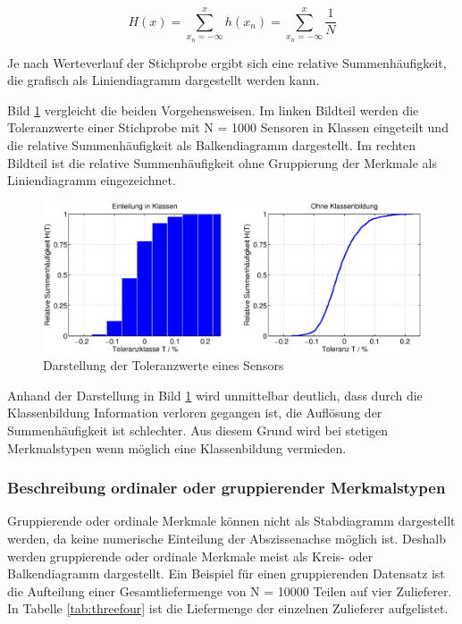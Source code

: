 \begin{equation}\label{eq:threefourteen}
H(x)=\sum _{x_{n} =-\infty }^{x}h(x_{n}) =\sum _{x_{n} =-\infty }^{x}\dfrac{1}{N}
\end{equation}

\noindent Je nach Werteverlauf der Stichprobe ergibt sich eine relative Summenh\"{a}ufigkeit, die grafisch als Liniendiagramm dargestellt werden kann. 

\noindent Bild \ref{fig:AuswertungDrucksensor} vergleicht die beiden Vorgehensweisen. Im linken Bildteil werden die Toleranzwerte einer Stichprobe mit N = 1000 Sensoren in Klassen eingeteilt und die relative Summenh\"{a}ufigkeit als Balkendiagramm dargestellt. Im rechten Bildteil ist die relative Summenh\"{a}ufigkeit ohne Gruppierung der Merkmale als Liniendiagramm eingezeichnet.

\noindent 
\begin{figure}[H]
  \centerline{\includegraphics[width=1\textwidth]{Kapitel3/Bilder/image5}}
  \caption{Darstellung der Toleranzwerte eines Sensors}
  \label{fig:AuswertungDrucksensor}
\end{figure}

\noindent Anhand der Darstellung in Bild \ref{fig:AuswertungDrucksensor} wird unmittelbar deutlich, dass durch die Klassenbildung Information verloren gegangen ist, die Aufl\"{o}sung der Summenh\"{a}ufigkeit ist schlechter. Aus diesem Grund wird bei stetigen Merkmalstypen wenn m\"{o}glich eine Klassenbildung vermieden.

\subsubsection{Beschreibung ordinaler oder gruppierender Merkmalstypen}

\noindent Gruppierende oder ordinale Merkmale k\"{o}nnen nicht als Stabdiagramm dargestellt werden, da keine numerische Einteilung der Abszissenachse m\"{o}glich ist. Deshalb werden gruppierende oder ordinale Merkmale meist als Kreis- oder Balkendiagramm dargestellt. Ein Beispiel f\"{u}r einen gruppierenden Datensatz ist die Aufteilung einer Gesamtliefermenge von N = 10000 Teilen auf vier Zulieferer. In Tabelle \ref{tab:threefour} ist die Liefermenge der einzelnen Zulieferer aufgelistet.

